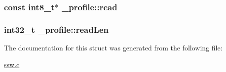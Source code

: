 \hypertarget{struct__profile_af911e1a81a7d7a8a74895a5a29e130ef}{
\subsubsection[{read}]{\setlength{\rightskip}{0pt plus 5cm}const int8\-\_\-t$\ast$ \-\_\-profile\-::read}}\label{struct__profile_af911e1a81a7d7a8a74895a5a29e130ef}
\hypertarget{struct__profile_ac40ce6b6e478fd12ea81e84dce46ee62}{
\subsubsection[{read\-Len}]{\setlength{\rightskip}{0pt plus 5cm}int32\-\_\-t \-\_\-profile\-::read\-Len}}\label{struct__profile_ac40ce6b6e478fd12ea81e84dce46ee62}


The documentation for this struct was generated from the following file\-:\begin{DoxyCompactItemize}
\item 
\hyperlink{ssw_8c}{ssw.\-c}\end{DoxyCompactItemize}
